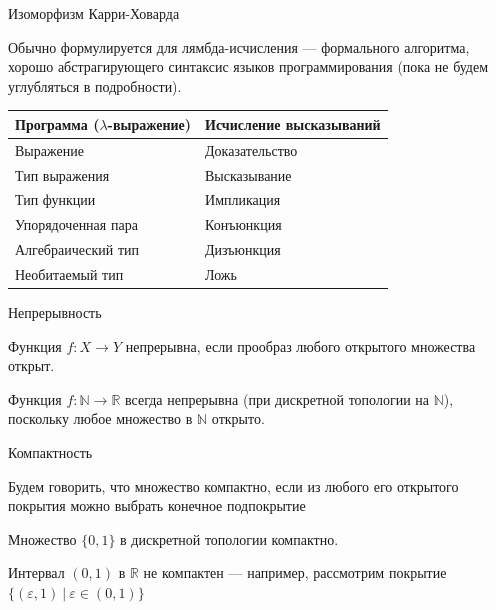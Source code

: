 \documentclass[aspectratio=169]{beamer}
\begin{document}
\begin{frame}{Изоморфизм Карри-Ховарда}

Обычно формулируется для лямбда-исчисления --- формального алгоритма, хорошо
абстрагирующего синтаксис языков программирования (пока не будем углубляться
в подробности).

\begin{center}\begin{tabular}{ll}
Программа ($\lambda$-выражение) & Исчисление высказываний\\\hline
Выражение & Доказательство\\
Тип выражения & Высказывание\\
Тип функции & Импликация\\
Упорядоченная пара & Конъюнкция\\
Алгебраический тип & Дизъюнкция\\
Необитаемый тип & Ложь
\end{tabular}\end{center}

\end{frame}

\begin{frame}{Непрерывность}
\begin{defrus}
Функция $f: X \rightarrow Y$ непрерывна, если прообраз любого открытого множества открыт.
\end{defrus}

\begin{exmprus}
Функция $f: \mathbb{N} \rightarrow \mathbb{R}$ всегда непрерывна (при дискретной топологии на $\mathbb{N}$), 
поскольку любое множество в $\mathbb{N}$ открыто.
\end{exmprus}
\end{frame}

\begin{frame}{Компактность}
\begin{defrus}Будем говорить, что множество компактно, если из любого его открытого покрытия можно выбрать конечное
подпокрытие
\end{defrus}

\begin{exmprus}
Множество $\{0,1\}$ в дискретной топологии компактно.
\end{exmprus}

\begin{exmprus}
Интервал $(0,1)$ в $\mathbb{R}$ не компактен --- например, рассмотрим покрытие $\{(\varepsilon,1)\ |\ \varepsilon\in(0,1)\}$ 
\end{exmprus}
\end{frame}
\end{document}
